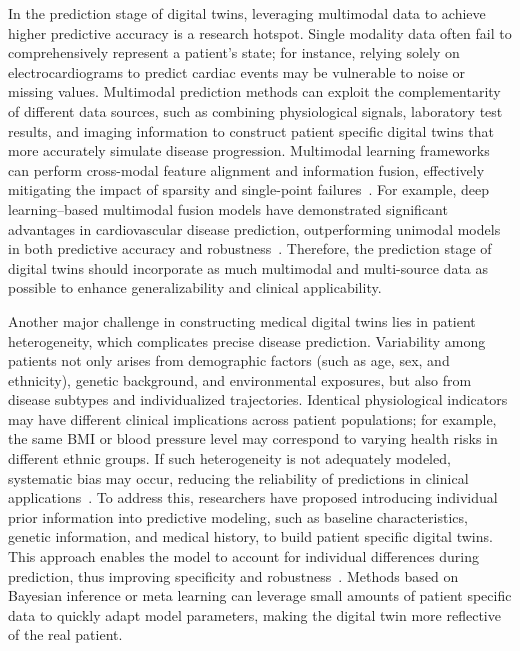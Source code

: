 \documentclass[acmsmall]{acmart}
\begin{document}
In the prediction stage of digital twins, leveraging multimodal data to achieve higher predictive accuracy is a research hotspot. Single modality data often fail to comprehensively represent a patient’s state; for instance, relying solely on electrocardiograms to predict cardiac events may be vulnerable to noise or missing values. Multimodal prediction methods can exploit the complementarity of different data sources, such as combining physiological signals, laboratory test results, and imaging information to construct patient specific digital twins that more accurately simulate disease progression. Multimodal learning frameworks can perform cross-modal feature alignment and information fusion, effectively mitigating the impact of sparsity and single-point failures~\cite{baltrusaitis2019multimodal}. For example, deep learning–based multimodal fusion models have demonstrated significant advantages in cardiovascular disease prediction, outperforming unimodal models in both predictive accuracy and robustness~\cite{huang2020fusion}. Therefore, the prediction stage of digital twins should incorporate as much multimodal and multi-source data as possible to enhance generalizability and clinical applicability.

Another major challenge in constructing medical digital twins lies in patient heterogeneity, which complicates precise disease prediction. Variability among patients not only arises from demographic factors (such as age, sex, and ethnicity), genetic background, and environmental exposures, but also from disease subtypes and individualized trajectories. Identical physiological indicators may have different clinical implications across patient populations; for example, the same BMI or blood pressure level may correspond to varying health risks in different ethnic groups. If such heterogeneity is not adequately modeled, systematic bias may occur, reducing the reliability of predictions in clinical applications~\cite{obermeyer2016predicting,rajkomar2019machine,yu2018artificial}. To address this, researchers have proposed introducing individual prior information into predictive modeling, such as baseline characteristics, genetic information, and medical history, to build patient specific digital twins. This approach enables the model to account for individual differences during prediction, thus improving specificity and robustness~\cite{bjornsson2020digitaltwins}. Methods based on Bayesian inference or meta learning can leverage small amounts of patient specific data to quickly adapt model parameters, making the digital twin more reflective of the real patient.
\end{document}
